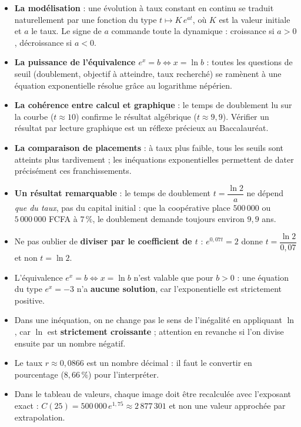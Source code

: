 \documentclass[11pt]{article}
\begin{document}
\begin{itemize}
\item \textbf{La modélisation} : une évolution à taux constant en continu se traduit naturellement par une fonction du type $t \mapsto K\,e^{at}$, où $K$ est la valeur initiale et $a$ le taux. Le signe de $a$ commande toute la dynamique : croissance si $a > 0$, décroissance si $a < 0$.
\item \textbf{La puissance de l'équivalence $e^{x} = b \iff x = \ln b$} : toutes les questions de seuil (doublement, objectif à atteindre, taux recherché) se ramènent à une équation exponentielle résolue grâce au logarithme népérien.
\item \textbf{La cohérence entre calcul et graphique} : le temps de doublement lu sur la courbe ($t \approx 10$) confirme le résultat algébrique ($t \approx 9,9$). Vérifier un résultat par lecture graphique est un réflexe précieux au Baccalauréat.
\item \textbf{La comparaison de placements} : à taux plus faible, tous les seuils sont atteints plus tardivement ; les inéquations exponentielles permettent de dater précisément ces franchissements.
\item \textbf{Un résultat remarquable} : le temps de doublement $t = \dfrac{\ln 2}{a}$ ne dépend \emph{que du taux}, pas du capital initial : que la coopérative place $500\,000$ ou $5\,000\,000$ FCFA à $7\,\%$, le doublement demande toujours environ $9,9$ ans.
\end{itemize}

\begin{attention}
\begin{itemize}
\item Ne pas oublier de \textbf{diviser par le coefficient de $t$} : $e^{0,07t} = 2$ donne $t = \dfrac{\ln 2}{0,07}$ et non $t = \ln 2$.
\item L'équivalence $e^{x} = b \iff x = \ln b$ n'est valable que pour $b > 0$ : une équation du type $e^{x} = -3$ n'a \textbf{aucune solution}, car l'exponentielle est strictement positive.
\item Dans une inéquation, on ne change pas le sens de l'inégalité en appliquant $\ln$, car $\ln$ est \textbf{strictement croissante} ; attention en revanche si l'on divise ensuite par un nombre négatif.
\item Le taux $r \approx 0,0866$ est un nombre décimal : il faut le convertir en pourcentage ($8,66\,\%$) pour l'interpréter.
\item Dans le tableau de valeurs, chaque image doit être recalculée avec l'exposant exact : $C(25) = 500\,000\,e^{1,75} \approx 2\,877\,301$ et non une valeur approchée par extrapolation.
\end{itemize}
\end{attention}
\end{document}
